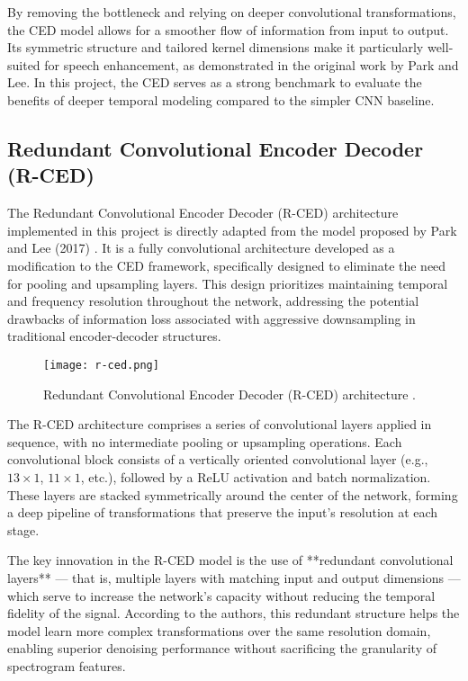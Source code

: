 By removing the bottleneck and relying on deeper convolutional transformations, the CED model allows for a smoother flow of information from input to output. Its symmetric structure and tailored kernel dimensions make it particularly well-suited for speech enhancement, as demonstrated in the original work by Park and Lee. In this project, the CED serves as a strong benchmark to evaluate the benefits of deeper temporal modeling compared to the simpler CNN baseline.

\subsection{Redundant Convolutional Encoder Decoder (R-CED)}

The Redundant Convolutional Encoder Decoder (R-CED) architecture implemented in this project is directly adapted from the model proposed by Park and Lee (2017) \cite{park2017acoustic}. It is a fully convolutional architecture developed as a modification to the CED framework, specifically designed to eliminate the need for pooling and upsampling layers. This design prioritizes maintaining temporal and frequency resolution throughout the network, addressing the potential drawbacks of information loss associated with aggressive downsampling in traditional encoder-decoder structures.

\begin{figure}[h]
    \centering
    \texttt{[image: r-ced.png]}
    \caption{\label{fig:rced}Redundant Convolutional Encoder Decoder (R-CED) architecture \cite{park2017acoustic}.}
\end{figure}

The R-CED architecture comprises a series of convolutional layers applied in sequence, with no intermediate pooling or upsampling operations. Each convolutional block consists of a vertically oriented convolutional layer (e.g., \(13 \times 1\), \(11 \times 1\), etc.), followed by a ReLU activation and batch normalization. These layers are stacked symmetrically around the center of the network, forming a deep pipeline of transformations that preserve the input's resolution at each stage.

The key innovation in the R-CED model is the use of **redundant convolutional layers** — that is, multiple layers with matching input and output dimensions — which serve to increase the network’s capacity without reducing the temporal fidelity of the signal. According to the authors, this redundant structure helps the model learn more complex transformations over the same resolution domain, enabling superior denoising performance without sacrificing the granularity of spectrogram features.

